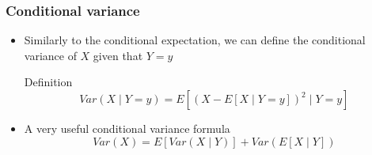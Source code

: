 \documentclass[slidestop,compress,mathserif]{beamer}
\begin{document}

\begin{frame}\frametitle{Conditional variance}
\begin{itemize}
\item Similarly to the conditional expectation, we can define the conditional variance of $X$ given that $Y = y$
\begin{block}{Definition}
$$Var(X \mid Y = y) = E[(X - E[X \mid Y = y])^2  \mid  Y = y]$$
\end{block}
\pause
\item A very useful conditional variance formula
$$Var(X) = E[Var(X \mid Y)] + Var(E[X \mid Y])$$
\end{itemize}
\end{frame}
\end{document}
